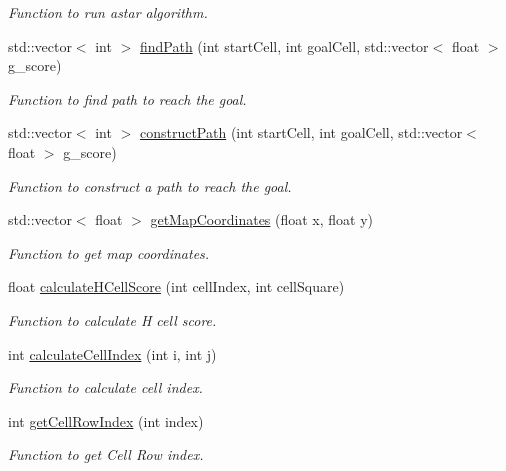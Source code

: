 \begin{DoxyCompactItemize}
\begin{DoxyCompactList}\small\item\em Function to run astar algorithm. \end{DoxyCompactList}\item 
std\+::vector$<$ int $>$ \hyperlink{classastar__plugin_1_1_a_star_planner_a65c23083aa562f0ce8a881d26fb020a7}{find\+Path} (int start\+Cell, int goal\+Cell, std\+::vector$<$ float $>$ g\+\_\+score)
\begin{DoxyCompactList}\small\item\em Function to find path to reach the goal. \end{DoxyCompactList}\item 
std\+::vector$<$ int $>$ \hyperlink{classastar__plugin_1_1_a_star_planner_aae75ccdcf38f6cd848d024a8aebc0bc0}{construct\+Path} (int start\+Cell, int goal\+Cell, std\+::vector$<$ float $>$ g\+\_\+score)
\begin{DoxyCompactList}\small\item\em Function to construct a path to reach the goal. \end{DoxyCompactList}\item 
std\+::vector$<$ float $>$ \hyperlink{classastar__plugin_1_1_a_star_planner_a875990bd4b8b9ab17855ce54b4df4780}{get\+Map\+Coordinates} (float x, float y)
\begin{DoxyCompactList}\small\item\em Function to get map coordinates. \end{DoxyCompactList}\item 
float \hyperlink{classastar__plugin_1_1_a_star_planner_a18fac92699522fa76a2add6ea75fa6fc}{calculate\+H\+Cell\+Score} (int cell\+Index, int cell\+Square)
\begin{DoxyCompactList}\small\item\em Function to calculate H cell score. \end{DoxyCompactList}\item 
int \hyperlink{classastar__plugin_1_1_a_star_planner_aa54d997cd223de69fb7a37a79dc5cd1c}{calculate\+Cell\+Index} (int i, int j)
\begin{DoxyCompactList}\small\item\em Function to calculate cell index. \end{DoxyCompactList}\item 
int \hyperlink{classastar__plugin_1_1_a_star_planner_a660c014cd14a8de3080b138b44f5437e}{get\+Cell\+Row\+Index} (int index)
\begin{DoxyCompactList}\small\item\em Function to get Cell Row index. \end{DoxyCompactList}\item 

\end{DoxyCompactItemize}
